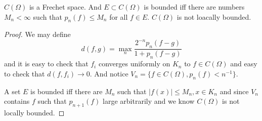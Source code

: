 \begin{proposition}
    $C(\Omega)$ is a Frechet space. And $E \subset C(\Omega)$ is bounded iff there are numbers $M_n < \infty$ such that $p_n(f) \leq M_n$ for all $f\in E$. $C(\Omega)$ is not loacally bounded.
\end{proposition}
\begin{proof}
    We may define
    \[
    d(f,g) = \max_{n}\dfrac{2^{-n}p_n(f-g)}{1+p_n(f-g)}
    \]
    and it is easy to check that $f_i$ converges uniformly on $K_n$ to $f \in C(\Omega)$ and easy to check that $d(f,f_i) \to 0$. And notice $V_n = \{f\in C(\Omega), p_n(f) < n^{-1}\}$.\par
    A set $E$ is bounded iff there are $M_n$ such that $|f(x)| \leq M_n, x\in K_n$ and since $V_n$ contains $f$ such that $p_{n+1}(f)$ large arbitrarily and we know $C(\Omega)$ is not locally bounded.
\end{proof}
